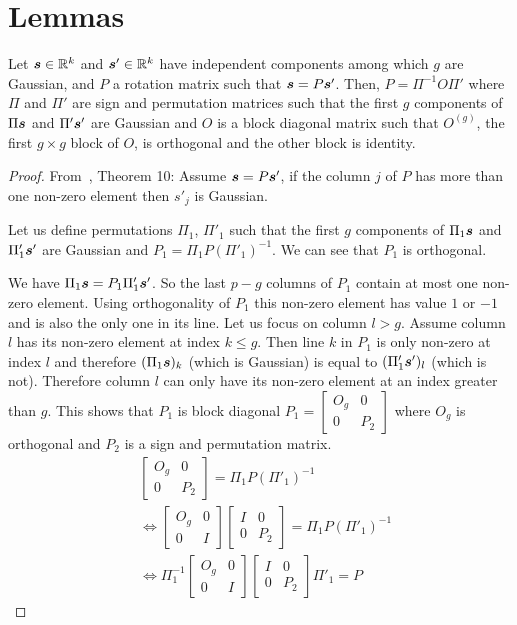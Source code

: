 \section{Lemmas}
\label{app:sec:lemmas}
\begin{lemma}
\label{lemma:ica}
Let $\boldsymbol{s} \in \mathbb{R}^k$ and $\boldsymbol{s}'\in \mathbb{R}^k$ have independent components among which $g$ are Gaussian, and $P$ a rotation matrix such that $\boldsymbol{s} = P\boldsymbol{s}'$. Then, $P=\Pi^{-1} O \Pi'$ where $\Pi$ and $\Pi'$ are sign and permutation matrices such that the first $g$ components of $\Pi \boldsymbol{s}$ and $\Pi' \boldsymbol{s}'$ are Gaussian and $O$ is a block diagonal matrix such that $O^{(g)}$, the first $g \times g$ block of $O$, is orthogonal and the other block is identity.
\end{lemma}
\begin{proof}
  From~\cite{comon1994independent}, Theorem 10:
  Assume $\boldsymbol{s} = P\boldsymbol{s}'$, if the column $j$ of $P$ has more than one non-zero element then $s'_j$ is Gaussian. 
  
  Let us define permutations $\Pi_1$, $\Pi'_1$ such that the first $g$ components of $\Pi_1 \boldsymbol{s}$ and $\Pi'_1 \boldsymbol{s}'$ are Gaussian and $P_1  = \Pi_1 P (\Pi'_1)^{-1}$. We can see that $P_1$ is orthogonal.
  
  We have $\Pi_1 \boldsymbol{s} = P_1 \Pi'_1 \boldsymbol{s}'$. So the last $p-g$ columns of $P_1$ contain at most one non-zero element. Using orthogonality of $P_1$ this non-zero element has value $1$ or $-1$ and is also the only one in its line. Let us focus on column $l > g$. Assume column $l$ has its non-zero element at index $k \leq g$. Then line $k$ in $P_1$ is only non-zero at index $l$ and therefore $(\Pi_1 \boldsymbol{s})_k$ (which is Gaussian) is equal to $(\Pi'_1 \boldsymbol{s}')_l$ (which is not). Therefore column $l$ can only have its non-zero element at an index greater than $g$. This shows that $P_1$ is block diagonal $P_1 = \begin{bmatrix} O_g & 0 \\ 0 & P_2 \end{bmatrix}$ where $O_g$ is orthogonal  and $P_2$ is a sign and permutation matrix.
  \begin{align}
      &\begin{bmatrix} O_g & 0 \\ 0 & P_2 \end{bmatrix} = \Pi_1 P (\Pi'_1)^{-1} \\
      & \iff \begin{bmatrix} O_g & 0 \\ 0 & I \end{bmatrix} \begin{bmatrix} I & 0 \\ 0 & P_2 \end{bmatrix}  = \Pi_1 P (\Pi'_1)^{-1} \\
      & \iff \Pi_1^{-1} \begin{bmatrix} O_g & 0 \\ 0 & I \end{bmatrix} \begin{bmatrix} I & 0 \\ 0 & P_2 \end{bmatrix} \Pi'_1  = P
  \end{align}
  

\end{proof}
